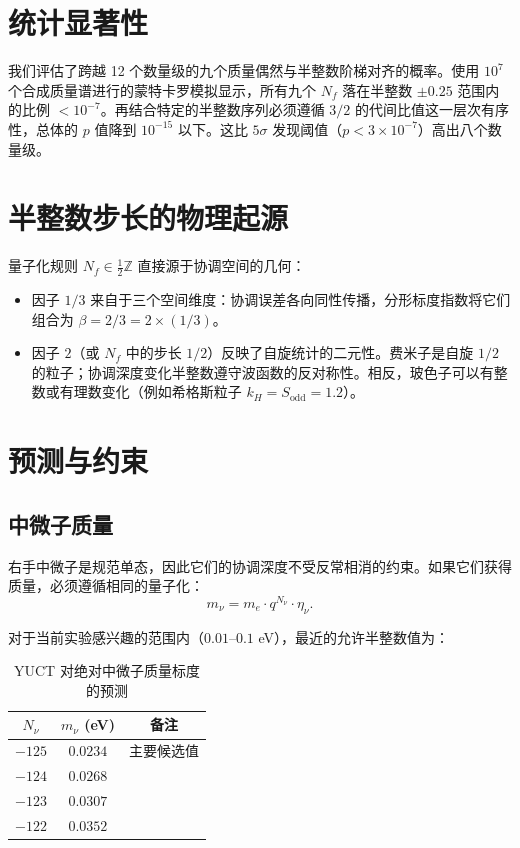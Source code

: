\documentclass[12pt,a4paper]{article}
\begin{document}
	\section{统计显著性}
	
	我们评估了跨越 12 个数量级的九个质量偶然与半整数阶梯对齐的概率。使用 $10^7$ 个合成质量谱进行的蒙特卡罗模拟显示，所有九个 $N_f$ 落在半整数 $\pm 0.25$ 范围内的比例 $< 10^{-7}$。再结合特定的半整数序列必须遵循 $3/2$ 的代间比值这一层次有序性，总体的 $p$ 值降到 $10^{-15}$ 以下。这比 $5\sigma$ 发现阈值（$p < 3\times 10^{-7}$）高出八个数量级。
	
	\section{半整数步长的物理起源}
	
	量子化规则 $N_f \in \frac{1}{2}\mathbb{Z}$ 直接源于协调空间的几何：
	\begin{itemize}
		\item 因子 $1/3$ 来自于三个空间维度：协调误差各向同性传播，分形标度指数将它们组合为 $\beta = 2/3 = 2 \times (1/3)$。
		\item 因子 $2$（或 $N_f$ 中的步长 $1/2$）反映了自旋统计的二元性。费米子是自旋 $1/2$ 的粒子；协调深度变化半整数遵守波函数的反对称性。相反，玻色子可以有整数或有理数变化（例如希格斯粒子 $k_H = S_{\mathrm{odd}} = 1.2$）。
	\end{itemize}
	
	\section{预测与约束}
	
	\subsection{中微子质量}
	
	右手中微子是规范单态，因此它们的协调深度不受反常相消的约束。如果它们获得质量，必须遵循相同的量子化：
	\begin{equation}
		m_\nu = m_e \cdot q^{N_\nu} \cdot \eta_\nu.
	\end{equation}
	
	对于当前实验感兴趣的范围内（$0.01$--$0.1$ eV），最近的允许半整数值为：
	
	\begin{table}[htbp]
		\centering
		\caption{YUCT 对绝对中微子质量标度的预测}
		\label{tab:neutrino}
		\begin{tabular}{c c c}
			\toprule
			$N_\nu$ & $m_\nu$ (eV) & 备注 \\
			\midrule
			$-125$ & $0.0234$ & 主要候选值 \\
			$-124$ & $0.0268$ & \\
			$-123$ & $0.0307$ & \\
			$-122$ & $0.0352$ & \\
			\bottomrule
		\end{tabular}
	\end{table}
	
\end{document}
